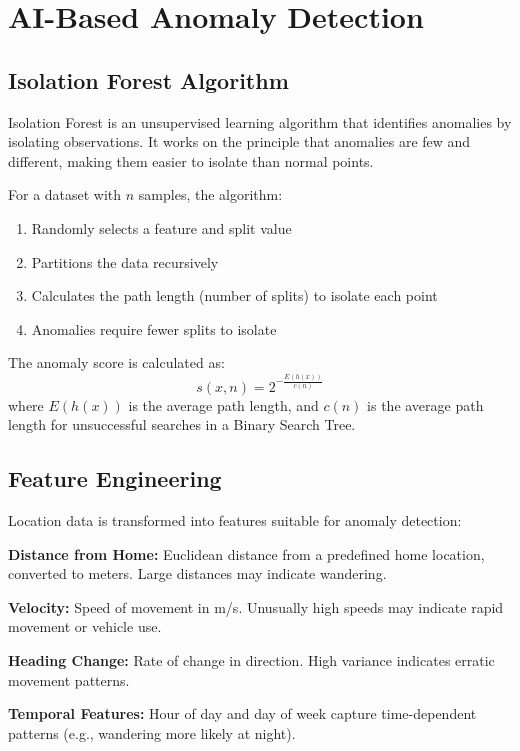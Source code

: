 \documentclass[conference]{IEEEtran}
\begin{document}
\section{AI-Based Anomaly Detection}

\subsection{Isolation Forest Algorithm}

Isolation Forest is an unsupervised learning algorithm that identifies anomalies by isolating observations. It works on the principle that anomalies are few and different, making them easier to isolate than normal points.

For a dataset with $n$ samples, the algorithm:
\begin{enumerate}
    \item Randomly selects a feature and split value
    \item Partitions the data recursively
    \item Calculates the path length (number of splits) to isolate each point
    \item Anomalies require fewer splits to isolate
\end{enumerate}

The anomaly score is calculated as:
\begin{equation}
s(x,n) = 2^{-\frac{E(h(x))}{c(n)}}
\end{equation}
where $E(h(x))$ is the average path length, and $c(n)$ is the average path length for unsuccessful searches in a Binary Search Tree.

\subsection{Feature Engineering}

Location data is transformed into features suitable for anomaly detection:

\textbf{Distance from Home:} Euclidean distance from a predefined home location, converted to meters. Large distances may indicate wandering.

\textbf{Velocity:} Speed of movement in m/s. Unusually high speeds may indicate rapid movement or vehicle use.

\textbf{Heading Change:} Rate of change in direction. High variance indicates erratic movement patterns.

\textbf{Temporal Features:} Hour of day and day of week capture time-dependent patterns (e.g., wandering more likely at night).
\end{document}
